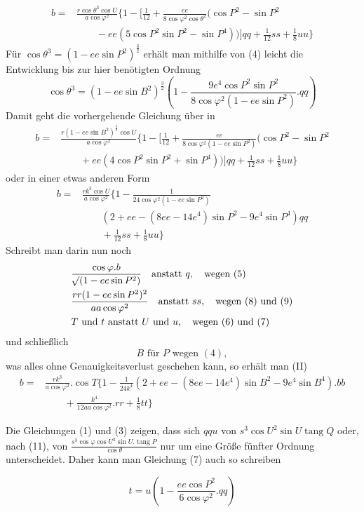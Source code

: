 %
\[
\begin{aligned}
b={}&\frac{r\cos\theta^3\cos U}{a\cos\varphi^2}\{1-[\tfrac1{12}+\frac{ee}{8\cos\varphi^2\cos\theta^2}(\cos P^2-\sin P^2\\
&\qquad-ee(5\cos P^2\sin P^2-\sin P^4))]qq+\tfrac1{12}ss+\tfrac18uu\}
\end{aligned}
\]
Für \(\cos\theta^3=(1-ee\sin P^2)^{\frac32}\) erhält man mithilfe von (4) leicht die Entwicklung bis zur hier benötigten Ordnung
\[
\cos\theta^3=(1-ee\sin B^2)^{\frac32}(1-\frac{9e^4\cos P^2\sin P^2}{8\cos\varphi^2(1-ee\sin P^2)}\mathord{.}qq)
\]
Damit geht die vorhergehende Gleichung über in
\[
\begin{aligned}
b={}&\frac{r(1-ee\sin B^2)^{\frac32}\cos U}{a\cos\varphi^2}\{1-[\tfrac1{12}+\frac{ee}{8\cos\varphi^2(1-ee\sin P^2)}(\cos P^2-\sin P^2\\
&\qquad+ee(4\cos P^2\sin P^2+\sin P^4))]qq+\tfrac1{12}ss+\tfrac18uu\}
\end{aligned}
\]
oder in einer etwas anderen Form
\[
\begin{aligned}
b={}&\frac{rk^3\cos U}{a\cos\varphi^2}\{1-\frac{1}{24\cos\varphi^2(1-ee\sin P^2)}\\
&\qquad(2+ee-(8ee-14e^4)\sin P^2-9e^4\sin P^4)qq\\
&\qquad+\tfrac1{12}ss+\tfrac18uu\}
\end{aligned}
\]
Schreibt man darin nun noch
\[
\begin{aligned}
&\frac{\cos\varphi\mathord{.}b}{\mathord{{}^{}\!\surd}(1-ee\sin P^2)}\quad\text{anstatt }q,\quad\text{wegen }(5)\\
&\frac{rr(1-ee\sin P^2)^2}{aa\cos\varphi^2}\quad\text{anstatt }ss,\quad\text{wegen }(8)\text{ und }(9)\\
&T\text{ und }t\text{ anstatt }U\text{ und }u,\quad\text{wegen }(6)\text{ und }(7)
\end{aligned}
\]
und schließlich
\[
B\text{ für }P\text{ wegen }(4),
\]
was alles ohne Genauigkeitsverlust geschehen kann, so erhält man (II)
\[
\begin{aligned}
b={}&\frac{rk^3}{a\cos\varphi^2}\mathord{.}\cos T\{1-\frac1{24k^4}(2+ee-(8ee-14e^4)\sin B^2-9e^4\sin B^4)\mathord{.}bb\\
&\qquad+\frac{k^4}{12aa\cos\varphi^2}\mathord{.}rr+\tfrac18tt\}
\end{aligned}
\]

\begingroup\raggedright
\hspace*{1.2em}Die Gleichungen (1) und (3) zeigen, dass sich \(qqu\) von \(s^3\cos U^2\sin U\operatorname{tang}Q\) oder, nach (11), von \(\frac{s^3\cos\varphi\cos U^2\sin U\mathord{.}\operatorname{tang}P}{\cos\theta}\) nur um eine Größe fünfter Ordnung unterscheidet. Daher kann man Gleichung (7) auch so schreiben\par\endgroup
\[
t=u(1-\frac{ee\cos P^2}{6\cos\varphi^2}\mathord{.}qq)
\]
